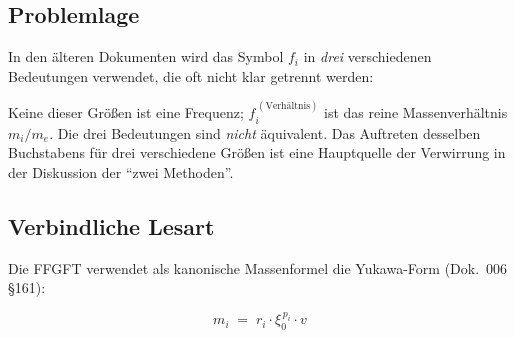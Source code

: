\subsection*{Problemlage}

In den älteren Dokumenten wird das Symbol $f_i$ in \emph{drei}
verschiedenen Bedeutungen verwendet, die oft nicht klar getrennt
werden:

\begin{center}
\renewcommand{\arraystretch}{1.4}
{\footnotesize
{}
}
\renewcommand{\arraystretch}{1.0}
\end{center}

Keine dieser Größen ist eine Frequenz; $f_i^{\,(\text{Verhältnis})}$
ist das reine Massenverhältnis $m_i/m_e$.
Die drei Bedeutungen sind \emph{nicht} äquivalent. Das Auftreten
desselben Buchstabens für drei verschiedene Größen ist eine
Hauptquelle der Verwirrung in der Diskussion der \enquote{zwei
Methoden}.

\subsection*{Verbindliche Lesart}

Die FFGFT verwendet als kanonische Massenformel die Yukawa-Form
(Dok.~006 §161):

\begin{equation}
  \boxed{\;m_i \;=\; r_i \cdot \xi_0^{\,p_i} \cdot v\;}
  \tag{210.9}
\end{equation}

